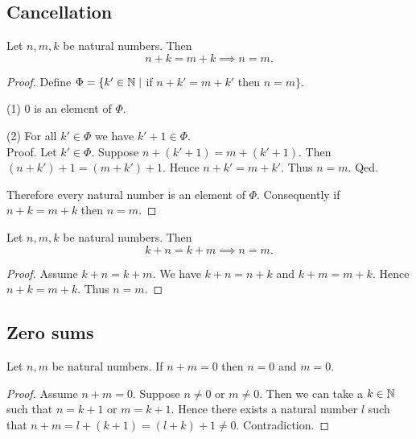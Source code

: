 \documentclass[../arithmetic.tex]{subfiles}
\begin{document}
  \subsection*{Cancellation}

  \begin{forthel}
    \begin{proposition}
      Let $n, m, k$ be natural numbers.
      Then \[ n + k = m + k \implies n = m. \]
    \end{proposition}
    \begin{proof}
      Define $\Phi = \{ k' \in \mathbb{N} \mid$ if $n + k' = m + k'$ then $n = m \}$.

      (1) $0$ is an element of $\Phi$.

      (2) For all $k' \in \Phi$ we have $k' + 1 \in \Phi$. \\
      Proof.
        Let $k' \in \Phi$.
        Suppose $n + (k' + 1) = m + (k' + 1)$.
        Then $(n + k') + 1 = (m + k') + 1$.
        Hence $n + k' = m + k'$.
        Thus $n = m$.
      Qed.

      Therefore every natural number is an element of $\Phi$.
      Consequently if $n + k = m + k$ then $n = m$.
    \end{proof}
  \end{forthel}

  \begin{forthel}
    \begin{corollary}
      Let $n, m, k$ be natural numbers.
      Then \[ k + n = k + m \implies n = m. \]
    \end{corollary}
    \begin{proof}
      Assume $k + n = k + m$.
      We have $k + n = n + k$ and $k + m = m + k$.
      Hence $n + k = m + k$.
      Thus $n = m$.
    \end{proof}
  \end{forthel}


  \subsection*{Zero sums}

  \begin{forthel}
    \begin{proposition}
      Let $n, m$ be natural numbers.
      If $n + m = 0$ then $n = 0$ and $m = 0$.
    \end{proposition}
    \begin{proof}
      Assume $n + m = 0$.
      Suppose $n \neq 0$ or $m \neq 0$.
      Then we can take a $k \in \mathbb{N}$ such that $n = k + 1$ or $m = k + 1$.
      Hence there exists a natural number $l$ such that
      $n + m
        = l + (k + 1)
        = (l + k) + 1
        \neq 0$.
      Contradiction.
    \end{proof}
  \end{forthel}
\end{document}
